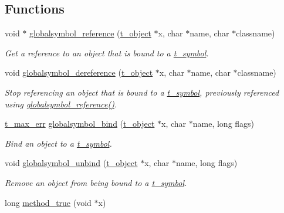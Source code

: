 \subsection*{Functions}
\begin{DoxyCompactItemize}
\item 
void $\ast$ \hyperlink{group__misc_ga72a33738916b577d2df121edfea260b3}{globalsymbol\_\-reference} (\hyperlink{structt__object}{t\_\-object} $\ast$x, char $\ast$name, char $\ast$classname)
\begin{DoxyCompactList}\small\item\em Get a reference to an object that is bound to a \hyperlink{structt__symbol}{t\_\-symbol}. \item\end{DoxyCompactList}\item 
void \hyperlink{group__misc_ga5a4773570564ab729cbe4031cfff0b45}{globalsymbol\_\-dereference} (\hyperlink{structt__object}{t\_\-object} $\ast$x, char $\ast$name, char $\ast$classname)
\begin{DoxyCompactList}\small\item\em Stop referencing an object that is bound to a \hyperlink{structt__symbol}{t\_\-symbol}, previously referenced using \hyperlink{group__misc_ga72a33738916b577d2df121edfea260b3}{globalsymbol\_\-reference()}. \item\end{DoxyCompactList}\item 
\hyperlink{group__datatypes_ga73edaae82b318855cc09fac994918165}{t\_\-max\_\-err} \hyperlink{group__misc_gaa121ff996fcf9cfb28d1c7c11eebc428}{globalsymbol\_\-bind} (\hyperlink{structt__object}{t\_\-object} $\ast$x, char $\ast$name, long flags)
\begin{DoxyCompactList}\small\item\em Bind an object to a \hyperlink{structt__symbol}{t\_\-symbol}. \item\end{DoxyCompactList}\item 
void \hyperlink{group__misc_gade40c44fddc370895da5db8f70e1868f}{globalsymbol\_\-unbind} (\hyperlink{structt__object}{t\_\-object} $\ast$x, char $\ast$name, long flags)
\begin{DoxyCompactList}\small\item\em Remove an object from being bound to a \hyperlink{structt__symbol}{t\_\-symbol}. \item\end{DoxyCompactList}\item 
\hypertarget{group__misc_ga157705d53ac5b0b839c72843712716c1}{
long \hyperlink{group__misc_ga157705d53ac5b0b839c72843712716c1}{method\_\-true} (void $\ast$x)}
\label{group__misc_ga157705d53ac5b0b839c72843712716c1}


\end{DoxyCompactItemize}
